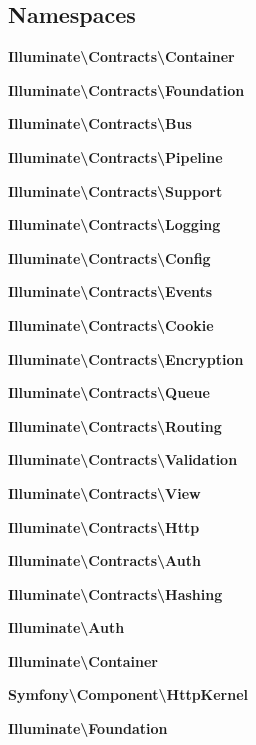 \subsection*{Namespaces}
\begin{DoxyCompactItemize}
\item 
 {\bf Illuminate\textbackslash{}\+Contracts\textbackslash{}\+Container}
\item 
 {\bf Illuminate\textbackslash{}\+Contracts\textbackslash{}\+Foundation}
\item 
 {\bf Illuminate\textbackslash{}\+Contracts\textbackslash{}\+Bus}
\item 
 {\bf Illuminate\textbackslash{}\+Contracts\textbackslash{}\+Pipeline}
\item 
 {\bf Illuminate\textbackslash{}\+Contracts\textbackslash{}\+Support}
\item 
 {\bf Illuminate\textbackslash{}\+Contracts\textbackslash{}\+Logging}
\item 
 {\bf Illuminate\textbackslash{}\+Contracts\textbackslash{}\+Config}
\item 
 {\bf Illuminate\textbackslash{}\+Contracts\textbackslash{}\+Events}
\item 
 {\bf Illuminate\textbackslash{}\+Contracts\textbackslash{}\+Cookie}
\item 
 {\bf Illuminate\textbackslash{}\+Contracts\textbackslash{}\+Encryption}
\item 
 {\bf Illuminate\textbackslash{}\+Contracts\textbackslash{}\+Queue}
\item 
 {\bf Illuminate\textbackslash{}\+Contracts\textbackslash{}\+Routing}
\item 
 {\bf Illuminate\textbackslash{}\+Contracts\textbackslash{}\+Validation}
\item 
 {\bf Illuminate\textbackslash{}\+Contracts\textbackslash{}\+View}
\item 
 {\bf Illuminate\textbackslash{}\+Contracts\textbackslash{}\+Http}
\item 
 {\bf Illuminate\textbackslash{}\+Contracts\textbackslash{}\+Auth}
\item 
 {\bf Illuminate\textbackslash{}\+Contracts\textbackslash{}\+Hashing}
\item 
 {\bf Illuminate\textbackslash{}\+Auth}
\item 
 {\bf Illuminate\textbackslash{}\+Container}
\item 
 {\bf Symfony\textbackslash{}\+Component\textbackslash{}\+Http\+Kernel}
\item 
 {\bf Illuminate\textbackslash{}\+Foundation}

\end{DoxyCompactItemize}
